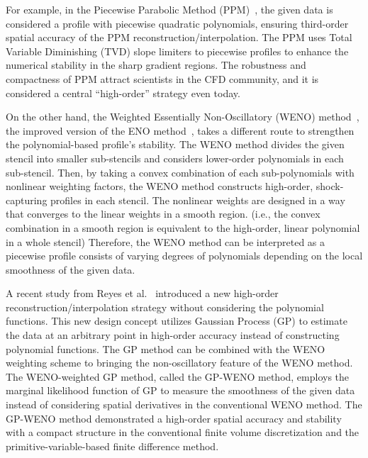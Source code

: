 For example, in the Piecewise Parabolic Method (PPM)~\cite{woodward1984numerical},
the given data is considered a profile with piecewise quadratic polynomials,
ensuring third-order spatial accuracy of the PPM reconstruction/interpolation.
The PPM uses Total Variable Diminishing (TVD) slope limiters to piecewise profiles
to enhance the numerical stability in the sharp gradient regions.
The robustness and compactness of PPM attract scientists in the CFD community,
and it is considered a central ``high-order'' strategy even today.

On the other hand, the Weighted Essentially Non-Oscillatory (WENO) method~\cite{jiang1996efficient},
the improved version of the ENO method~\cite{harten1987uniformly},
takes a different route to strengthen the polynomial-based profile's stability.
The WENO method divides the given stencil into smaller sub-stencils and considers
lower-order polynomials in each sub-stencil.
Then, by taking a convex combination of each sub-polynomials with nonlinear weighting factors,
the WENO method constructs high-order, shock-capturing profiles in each stencil.
The nonlinear weights are designed in a way that converges to the linear weights in a smooth region.
(i.e., the convex combination in a smooth region is equivalent to the high-order, linear polynomial in a whole stencil)
Therefore, the WENO method can be interpreted as a piecewise profile
consists of varying degrees of polynomials depending on the local smoothness of the given data.

A recent study from Reyes et al.~\cite{reyes2018new,reyes2019variable} introduced
a new high-order reconstruction/interpolation strategy without considering the polynomial functions.
This new design concept utilizes Gaussian Process (GP) to estimate the data
at an arbitrary point in high-order accuracy instead of constructing polynomial functions.
The GP method can be combined with the WENO weighting scheme to bringing
the non-oscillatory feature of the WENO method.
The WENO-weighted GP method, called the GP-WENO method,
employs the marginal likelihood function of GP to measure the smoothness of the given data
instead of considering spatial derivatives in the conventional WENO method.
The GP-WENO method demonstrated a high-order spatial accuracy and stability with a compact structure
in the conventional finite volume discretization and
the primitive-variable-based finite difference method.

